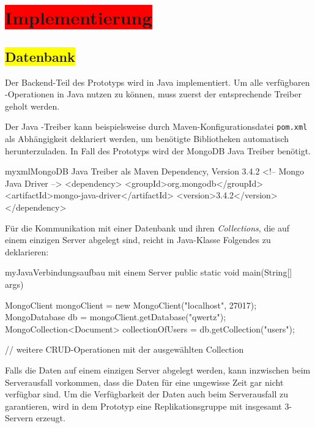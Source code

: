 \section{\colorbox{red}{Implementierung}}

\subsection{\colorbox{yellow}{Datenbank}}

Der Backend-Teil des Prototyps wird in Java implementiert. Um alle verfügbaren \mongo-Operationen in Java nutzen zu können, muss zuerst der entsprechende Treiber geholt werden.

Der Java \mongo-Treiber kann beispielsweise durch Maven-Konfigurationsdatei \texttt{pom.xml} als Abhängigkeit deklariert werden, um benötigte Bibliotheken automatisch herunterzuladen. In Fall des Prototyps wird der MongoDB Java Treiber benötigt.

\begin{listingsboxJava}[label={lst:pom}]{myxml}{MongoDB Java Treiber als Maven Dependency, Version 3.4.2}
	<!-- Mongo Java Driver -->
	<dependency>
		<groupId>org.mongodb</groupId>
		<artifactId>mongo-java-driver</artifactId>
		<version>3.4.2</version>
	</dependency>
\end{listingsboxJava}

Für die Kommunikation mit einer Datenbank und ihren \textit{Collections}, die auf einem einzigen Server abgelegt sind, reicht in Java-Klasse Folgendes zu deklarieren:
\begin{listingsboxJava}[label={lst:conn}]{myJava}{Verbindungsaufbau mit einem Server}
public static void main(String[] args) {

	MongoClient mongoClient = new MongoClient("localhost", 27017);
	MongoDatabase db = mongoClient.getDatabase("qwertz");
	MongoCollection<Document> collectionOfUsers = db.getCollection("users");
        
        // weitere CRUD-Operationen mit der ausgewählten Collection
}
\end{listingsboxJava}

Falls die Daten auf einem einzigen Server abgelegt werden, kann inzwischen beim Serverausfall vorkommen, dass die Daten für eine ungewisse Zeit gar nicht verfügbar sind. Um die Verfügbarkeit der Daten auch beim Serverausfall zu garantieren, wird in dem Prototyp eine Replikationsgruppe mit insgesamt  3-Servern erzeugt.

